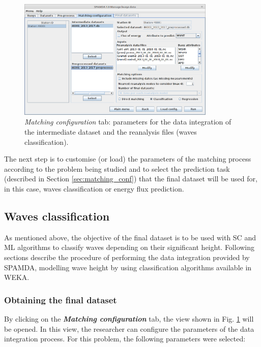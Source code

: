 \documentclass[energies,article,submit,moreauthors,pdftex]{Definitions/mdpi}
\begin{document}
			\begin{figure}[ht!]
				\centering
				\includegraphics[width=0.84\textwidth]{figures/FigureMatching_configuration.png}
				\caption{\textit{Matching configuration} tab: parameters for the data integration of the intermediate dataset and the reanalysis files (waves classification).}\label{fig:matching_conf_wc}
			\end{figure}
			
			The next step is to customise (or load) the parameters of the matching process according to the problem being studied and to select the prediction task (described in Section \ref{sec:matching_conf}) that the final dataset will be used for, in this case, waves classification or energy flux prediction.
			
			\subsection{Waves classification}
			
			As mentioned above, the objective of the final dataset is to be used with SC and ML algorithms to classify waves depending on their significant height. Following sections describe the procedure of performing the data integration provided by SPAMDA, modelling wave height by using classification algorithms available in WEKA.
			
			\subsubsection{Obtaining the final dataset}
			
			By clicking on the \textbf{\textit{Matching configuration}} tab, the view shown in Fig. \ref{fig:matching_conf_wc} will be opened. In this view, the researcher can configure the parameters of the data integration process. For this problem, the following parameters were selected:
			
\end{document}
